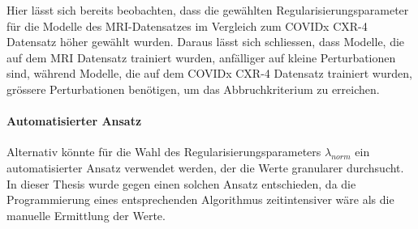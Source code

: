 Hier lässt sich bereits beobachten, dass die gewählten Regularisierungsparameter für die Modelle des MRI-Datensatzes im Vergleich zum COVIDx CXR-4 Datensatz höher gewählt wurden. Daraus lässt sich schliessen, dass Modelle, die auf dem MRI Datensatz trainiert wurden, anfälliger auf kleine Perturbationen sind, während Modelle, die auf dem COVIDx CXR-4 Datensatz trainiert wurden, grössere Perturbationen benötigen, um das Abbruchkriterium zu erreichen.

\paragraph{Automatisierter Ansatz}
Alternativ könnte für die Wahl des Regularisierungsparameters $\lambda_{norm}$ ein automatisierter Ansatz verwendet werden, der die Werte granularer durchsucht. In dieser Thesis wurde gegen einen solchen Ansatz entschieden, da die Programmierung eines entsprechenden Algorithmus zeitintensiver wäre als die manuelle Ermittlung der Werte.
